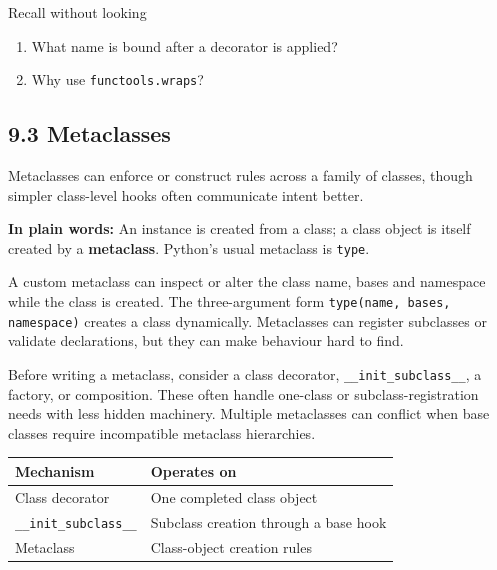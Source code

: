\documentclass[11pt]{article}
\begin{document}
\begin{keepsection}
\begin{recallbox}{Recall without looking}
\begin{enumerate}
\item What name is bound after a decorator is applied?
\item Why use \texttt{functools.wraps}?
\end{enumerate}

\end{recallbox}
\end{keepsection}

\begin{keepsection}
\section{9.3 Metaclasses}

Metaclasses can enforce or construct rules across a family of classes, though simpler class-level hooks often communicate intent better.

\begin{plainbox}\textbf{In plain words:} An instance is created from a class; a class object is itself created by a \textbf{metaclass}. Python’s usual metaclass is \texttt{type}.\end{plainbox}

A custom metaclass can inspect or alter the class name, bases and namespace while the class is created. The three-argument form \texttt{type(name, bases, namespace)} creates a class dynamically. Metaclasses can register subclasses or validate declarations, but they can make behaviour hard to find.

Before writing a metaclass, consider a class decorator, \texttt{\_\_init\_subclass\_\_}, a factory, or composition. These often handle one-class or subclass-registration needs with less hidden machinery. Multiple metaclasses can conflict when base classes require incompatible metaclass hierarchies.

\begin{center}\small\begin{tabularx}{\linewidth}{>{\raggedright\arraybackslash}X>{\raggedright\arraybackslash}X}\toprule
\textbf{Mechanism} & \textbf{Operates on} \\ \midrule
Class decorator & One completed class object \\
\texttt{\_\_init\_subclass\_\_} & Subclass creation through a base hook \\
Metaclass & Class-object creation rules \\
\bottomrule\end{tabularx}\end{center}


\end{keepsection}
\end{document}
